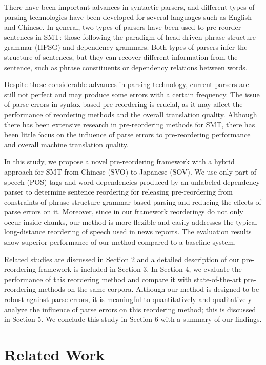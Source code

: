 \documentclass[english]{jnlp_1.4}
\begin{document}
There have been important advances in syntactic parsers, and different types of 
parsing technologies have been developed for several languages such as English and 
Chinese. In general, two types of parsers have been used to pre-reorder sentences 
in SMT: those following the paradigm of head-driven phrase structure grammar (HPSG) \cite{HPSG1994} 
and dependency grammars. Both types of parsers infer the structure of sentences, 
but they can recover different information from the sentence, such as phrase 
constituents or dependency relations between words.

Despite these considerable advances in parsing technology, current parsers are 
still not perfect and may produce some errors with a certain frequency. The issue 
of parse errors in syntax-based pre-reordering is crucial, as it may affect the 
performance of reordering methods and the overall translation quality. Although 
there has been extensive research in pre-reordering methods for SMT, there has 
been little focus on the influence of parse errors to pre-reordering performance 
and overall machine translation quality.

In this study, we propose a novel pre-reordering framework with a hybrid approach 
for SMT from Chinese (SVO) to Japanese (SOV). We use only part-of-speech (POS) 
tags and word dependencies produced by an unlabeled dependency parser to determine 
sentence reordering for releasing pre-reordering from constraints of 
phrase structure grammar based parsing and reducing the effects of parse errors 
on it. Moreover, since in our framework reorderings do not only occur inside chunks, 
our method is more flexible and easily addresses the typical long-distance reordering 
of speech used in news reports. The evaluation results show superior performance 
of our method compared to a baseline system.

Related studies are discussed in Section 2 and a detailed description of our 
pre-reordering framework is included in Section 3. In Section 4, we evaluate the 
performance of this reordering method and compare it with state-of-the-art 
pre-reordering methods on the same corpora. Although our method is designed to be
robust against parse errors, it is meaningful to quantitatively and qualitatively analyze 
the influence of parse errors on this reordering method; this is discussed in 
Section 5. We conclude this study in Section 6 with a summary of our findings.


\section{Related Work}
\label{sec:rw}
\end{document}
